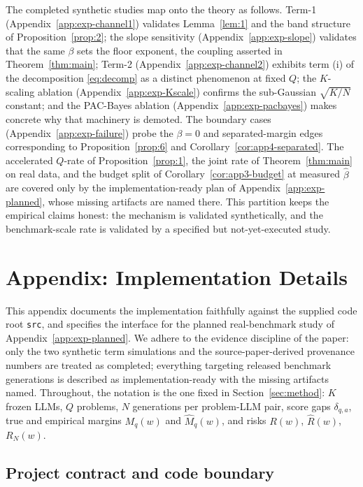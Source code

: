 \documentclass{article} %
\providecommand{\Risk}{R}
\providecommand{\eRisk}{\widehat{R}}
\providecommand{\Mhat}{\widehat{M}}
\begin{document}
The completed synthetic studies map onto the theory as follows.  Term-1
(Appendix~\ref{app:exp-channel1}) validates Lemma~\ref{lem:1} and the band
structure of Proposition~\ref{prop:2}; the slope sensitivity
(Appendix~\ref{app:exp-slope}) validates that the same $\beta$ sets the floor
exponent, the coupling asserted in Theorem~\ref{thm:main}; Term-2
(Appendix~\ref{app:exp-channel2}) exhibits term (i) of the decomposition
\eqref{eq:decomp} as a distinct phenomenon at fixed $Q$; the $K$-scaling
ablation (Appendix~\ref{app:exp-Kscale}) confirms the sub-Gaussian
$\sqrt{K/N}$ constant; and the PAC-Bayes ablation
(Appendix~\ref{app:exp-pacbayes}) makes concrete why that machinery is demoted.
The boundary cases (Appendix~\ref{app:exp-failure}) probe the $\beta=0$ and
separated-margin edges corresponding to Proposition~\ref{prop:6} and
Corollary~\ref{cor:app4-separated}.  The accelerated $Q$-rate of
Proposition~\ref{prop:1}, the joint rate of Theorem~\ref{thm:main} on real
data, and the budget split of Corollary~\ref{cor:app3-budget} at measured
$\widehat\beta$ are covered only by the implementation-ready plan of
Appendix~\ref{app:exp-planned}, whose missing artifacts are named there.  This
partition keeps the empirical claims honest: the mechanism is validated
synthetically, and the benchmark-scale rate is validated by a specified but
not-yet-executed study.


\section{Appendix: Implementation Details}
\label{app:implementation}

This appendix documents the implementation faithfully against the supplied
code root \texttt{src}, and specifies the interface for the planned
real-benchmark study of Appendix~\ref{app:exp-planned}.  We adhere to the
evidence discipline of the paper: only the two synthetic term simulations
and the source-paper-derived provenance numbers are treated as completed;
everything targeting released benchmark generations is described as
implementation-ready with the missing artifacts named.  Throughout, the
notation is the one fixed in Section~\ref{sec:method}: $K$ frozen LLMs, $Q$
problems, $N$ generations per problem-LLM pair, score gaps $\delta_{q,a}$, true
and empirical margins $M_q(w)$ and $\Mhat_q(w)$, and risks $\Risk(w)$,
$\eRisk(w)$, $\Risk_N(w)$.

\subsection{Project contract and code boundary}
\label{app:impl-contract}
\end{document}
